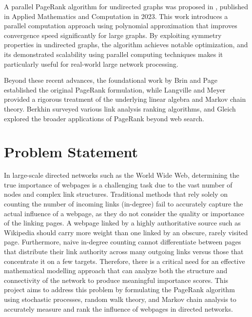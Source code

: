 \documentclass[conference]{IEEEtran}
\begin{document}
A parallel PageRank algorithm for undirected graphs was proposed in \cite{b11}, published in Applied Mathematics and Computation in 2023. This work introduces a parallel computation approach using polynomial approximation that improves convergence speed significantly for large graphs. By exploiting symmetry properties in undirected graphs, the algorithm achieves notable optimization, and its demonstrated scalability using parallel computing techniques makes it particularly useful for real-world large network processing.

Beyond these recent advances, the foundational work by Brin and Page \cite{b1} established the original PageRank formulation, while Langville and Meyer \cite{b4} provided a rigorous treatment of the underlying linear algebra and Markov chain theory. Berkhin \cite{b12} surveyed various link analysis ranking algorithms, and Gleich \cite{b13} explored the broader applications of PageRank beyond web search.

\section{Problem Statement}
In large-scale directed networks such as the World Wide Web, determining the true importance of webpages is a challenging task due to the vast number of nodes and complex link structures. Traditional methods that rely solely on counting the number of incoming links (in-degree) fail to accurately capture the actual influence of a webpage, as they do not consider the quality or importance of the linking pages. A webpage linked by a highly authoritative source such as Wikipedia should carry more weight than one linked by an obscure, rarely visited page. Furthermore, naive in-degree counting cannot differentiate between pages that distribute their link authority across many outgoing links versus those that concentrate it on a few targets. Therefore, there is a critical need for an effective mathematical modelling approach that can analyze both the structure and connectivity of the network to produce meaningful importance scores. This project aims to address this problem by formulating the PageRank algorithm using stochastic processes, random walk theory, and Markov chain analysis to accurately measure and rank the influence of webpages in directed networks.
\end{document}
